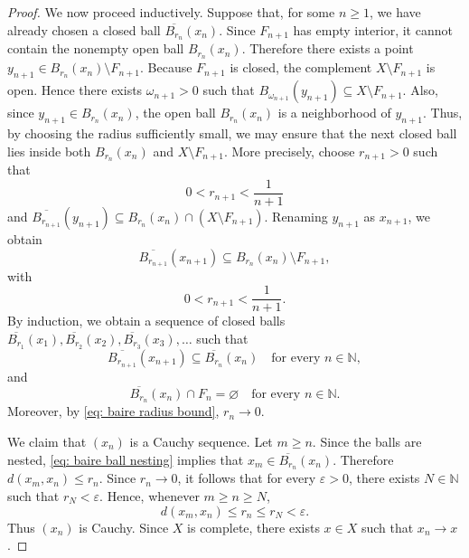 \begin{proof}
    We now proceed inductively. Suppose that, for some \(n \geq 1\), we have already chosen a closed ball \(\overline{B_{r_n}}(x_n)\). Since \(F_{n+1}\) has empty interior, it cannot contain the nonempty open ball \(B_{r_n}(x_n)\). Therefore there exists a point \(y_{n+1} \in B_{r_n}(x_n) \setminus F_{n+1}\). Because \(F_{n+1}\) is closed, the complement \(X \setminus F_{n+1}\) is open. Hence there exists \(\omega_{n+1} > 0\) such that \(B_{\omega_{n+1}}(y_{n+1}) \subseteq X \setminus F_{n+1}\). Also, since \(y_{n+1} \in B_{r_n}(x_n)\), the open ball \(B_{r_n}(x_n)\) is a neighborhood of \(y_{n+1}\). Thus, by choosing the radius sufficiently small, we may ensure that the next closed ball lies inside both \(B_{r_n}(x_n)\) and \(X \setminus F_{n+1}\). More precisely, choose \(r_{n+1} > 0\) such that
    \[
        0 < r_{n+1} < \frac{1}{n+1}
    \]
    and \(\overline{B_{r_{n+1}}}(y_{n+1}) \subseteq B_{r_n}(x_n) \cap (X \setminus F_{n+1})\). Renaming \(y_{n+1}\) as \(x_{n+1}\), we obtain
    \[
        \overline{B_{r_{n+1}}}(x_{n+1}) \subseteq B_{r_n}(x_n) \setminus F_{n+1},
    \]
    with
    \begin{equation} \label{eq: baire radius bound}
        0 < r_{n+1} < \frac{1}{n+1}.
    \end{equation}
    By induction, we obtain a sequence of closed balls \(\overline{B_{r_1}}(x_1), \overline{B_{r_2}}(x_2), \overline{B_{r_3}}(x_3), \ldots\) such that
    \begin{equation} \label{eq: baire ball nesting}
        \overline{B_{r_{n+1}}}(x_{n+1}) \subseteq \overline{B_{r_n}}(x_n) \quad \text{for every } n \in \mathbb{N},
    \end{equation}
    and
    \begin{equation} \label{eq: baire ball disjoint}
        \overline{B_{r_n}}(x_n) \cap F_n = \varnothing \quad \text{for every } n \in \mathbb{N}.
    \end{equation}
    Moreover, by \autoref{eq: baire radius bound}, \(r_n \to 0\).

    We claim that \((x_n)\) is a Cauchy sequence. Let \(m \geq n\). Since the balls are nested, \autoref{eq: baire ball nesting} implies that \(x_m \in \overline{B_{r_n}}(x_n)\). Therefore \(d(x_m, x_n) \leq r_n\). Since \(r_n \to 0\), it follows that for every \(\varepsilon > 0\), there exists \(N \in \mathbb{N}\) such that \(r_N < \varepsilon\). Hence, whenever \(m \geq n \geq N\),
    \[
        d(x_m, x_n) \leq r_n \leq r_N < \varepsilon.
    \]
    Thus \((x_n)\) is Cauchy. Since \(X\) is complete, there exists \(x \in X\) such that \(x_n \to x\).


\end{proof}
